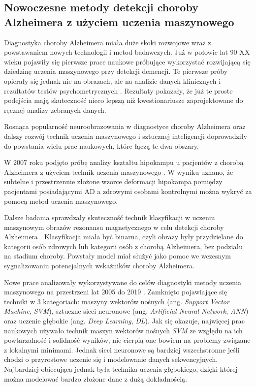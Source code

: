 \subsection{Nowoczesne metody detekcji choroby Alzheimera z użyciem uczenia maszynowego}

Diagnostyka choroby Alzheimera miała duże skoki rozwojowe wraz z powstawaniem nowych technologii i metod badawczych.
Już w połowie lat 90 XX wieku pojawiły się pierwsze prace naukowe próbujące wykorzystać rozwijającą się dziedzinę uczenia maszynowego przy detekcji demencji.
Te pierwsze próby opierały się jednak nie na obrazach, ale na analizie danych klinicznych i rezultatów testów psychometrycznych \cite{datta1996applying}.
Rezultaty pokazały, że już te proste podejścia mają skuteczność nieco lepszą niż kwestionariusze zaprojektowane do ręcznej analizy zebranych danych.

Rosnąca popularność neuroobrazowania w diagnostyce choroby Alzheimera oraz dalszy rozwój technik uczenia maszynowego i sztucznej inteligencji doprowadziły do powstania wielu prac naukowych, które łączą te dwa obszary.

W 2007 roku podjęto próbę analizy kształtu hipokampu u pacjentów z chorobą Alzheimera z użyciem technik uczenia maszynowego \cite{li2007hippocampal}.
W wyniku uznano, że subtelne i przestrzennie złożone wzorce deformacji hipokampa pomiędzy pacjentami posiadającymi AD a zdrowymi osobami kontrolnymi można wykryć za pomocą metod uczenia maszynowego.

Dalsze badania sprawdzały skuteczność technik klasyfikacji w uczeniu maszynowym obrazów rezonansu magnetycznego w celu detekcji choroby Alzheimera \cite{herrera2013classification}.
Klasyfikacja miała być binarna, czyli obrazy były przydzielane do kategorii osób zdrowych lub kategorii osób z chorobą Alzheimera, bez podziału na stadium choroby.
Powstały model miał służyć jako pomoc we wczesnym sygnalizowaniu potencjalnych wskaźników choroby Alzheimera.

Nowe prace analizowały wykorzystywane do celów diagnostyki metody uczenia maszynowego na przestrzeni lat 2005 do 2019 \cite{tanveer2020machine}.
Zamknięto pojawiające się techniki w 3 kategoriach: maszyny wektorów nośnych (ang. \emph{Support Vector Machine}, \emph{SVM}), sztuczne sieci neuronowe (ang. \emph{Artificial Neural Network}, \emph{ANN}) oraz uczenie głębokie (ang. \emph{Deep Learning}, \emph{DL}).
Jak się okazuje, najwięcej prac naukowych używało technik maszyn wektorów nośnych \emph{SVM} ze względu na ich powtarzalność i solidność wyników, nie cierpią one bowiem na problemy związane z lokalnymi minimami.
Jednak sieci neuronowe są bardziej wszechstronne jeśli chodzi o przyrostowe uczenie się i modelowanie danych sekwencyjnych.
Najbardziej obiecująca jednak była technika uczenia głębokiego, dzięki której można modelować bardzo złożone dane z dużą dokładnością.


